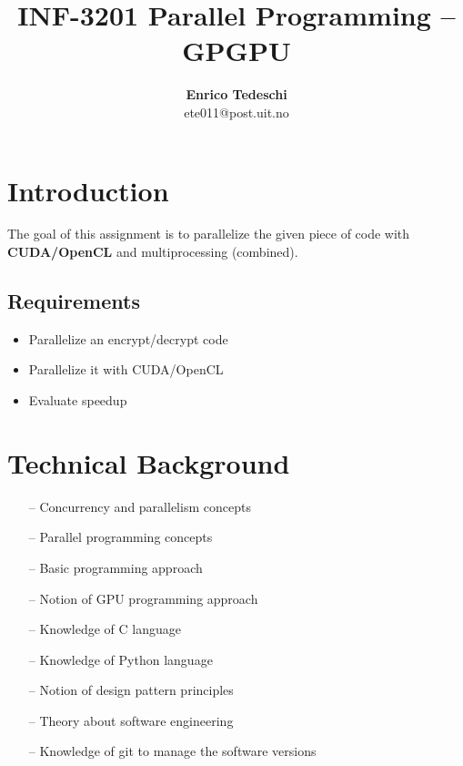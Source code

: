 \documentclass[11pt,conference]{IEEEtran}
\title{INF-3201 Parallel Programming -- GPGPU}
\author{\textbf{Enrico Tedeschi}\\ ete011@post.uit.no }
\begin{document}
\maketitle

\section{Introduction}
The goal of this assignment is to parallelize the given piece of code with \textbf{CUDA/OpenCL} and multiprocessing (combined).

\subsection{Requirements}
\begin{itemize} 
\item Parallelize an encrypt/decrypt code
\item Parallelize it with CUDA/OpenCL
\item Evaluate speedup
\end{itemize}


\section{Technical Background}

\begin{itemize} 
\item[--] Concurrency and parallelism concepts
\item[--] Parallel programming concepts
\item[--] Basic programming approach
\item[--] Notion of GPU programming approach 
\item[--] Knowledge of C language
\item[--] Knowledge of Python language
\item[--] Notion of design pattern principles
\item[--] Theory about software engineering
\item[--] Knowledge of git to manage the software versions
\end{itemize}
\end{document}
